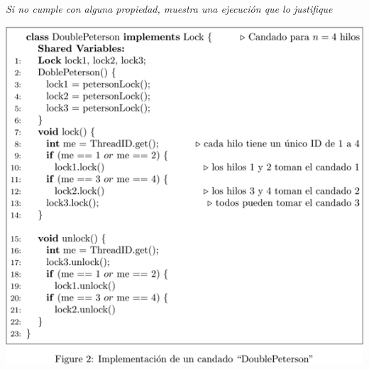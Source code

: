 \begin{enumerate}
    \textit{Si no cumple con alguna propiedad, muestra una ejecución que lo justifique}

    \begin{center}
            \includegraphics[width = 12 cm]{images/Figure2_tarea2.png}
    \end{center}
    
\end{enumerate}
